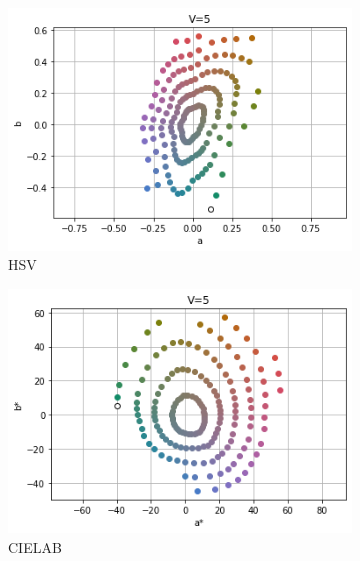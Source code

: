 \documentclass[12pt, a4paper, ngerman]{article}
\begin{document}
\begin{figure}
  \begin{subfigure}[b]{0.3\linewidth}
    \includegraphics[width=\linewidth]{Grafiken/Vergleich_Munsell/hsv_munsell.png}
    \caption{HSV}
    \label{fig:munsell_hsv}
  \end{subfigure}
  \begin{subfigure}[b]{0.3\linewidth}
    \includegraphics[width=\linewidth]{Grafiken/Vergleich_Munsell/cielab_munsell.png}
    \caption{CIELAB}
    \label{fig:munsell_cielab}
  \end{subfigure}
  \begin{subfigure}[b]{0.3\linewidth}

\end{subfigure}
\end{figure}
\end{document}
